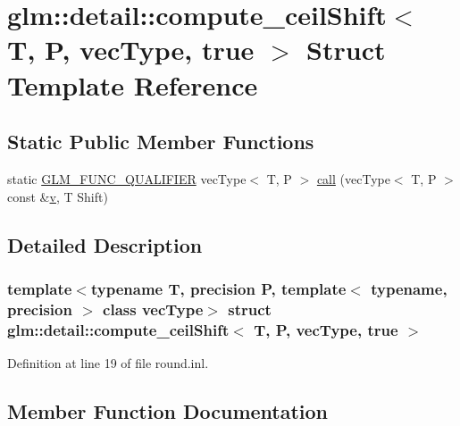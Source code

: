 \hypertarget{structglm_1_1detail_1_1compute__ceil_shift_3_01_t_00_01_p_00_01vec_type_00_01true_01_4}{}\section{glm\+::detail\+::compute\+\_\+ceil\+Shift$<$ T, P, vec\+Type, true $>$ Struct Template Reference}
\label{structglm_1_1detail_1_1compute__ceil_shift_3_01_t_00_01_p_00_01vec_type_00_01true_01_4}
\subsection*{Static Public Member Functions}
\begin{DoxyCompactItemize}
\item 
static \mbox{\hyperlink{setup_8hpp_a33fdea6f91c5f834105f7415e2a64407}{G\+L\+M\+\_\+\+F\+U\+N\+C\+\_\+\+Q\+U\+A\+L\+I\+F\+I\+ER}} vec\+Type$<$ T, P $>$ \mbox{\hyperlink{structglm_1_1detail_1_1compute__ceil_shift_3_01_t_00_01_p_00_01vec_type_00_01true_01_4_ae120f08254abe3447d5f3310138fc6a3}{call}} (vec\+Type$<$ T, P $>$ const \&\mbox{\hyperlink{glad_8h_a14cfbe2fc2234f5504618905b69d1e06}{v}}, T Shift)
\end{DoxyCompactItemize}


\subsection{Detailed Description}
\subsubsection*{template$<$typename T, precision P, template$<$ typename, precision $>$ class vec\+Type$>$\newline
struct glm\+::detail\+::compute\+\_\+ceil\+Shift$<$ T, P, vec\+Type, true $>$}



Definition at line 19 of file round.\+inl.



\subsection{Member Function Documentation}
\mbox{\label{structglm_1_1detail_1_1compute__ceil_shift_3_01_t_00_01_p_00_01vec_type_00_01true_01_4_ae120f08254abe3447d5f3310138fc6a3}} 
